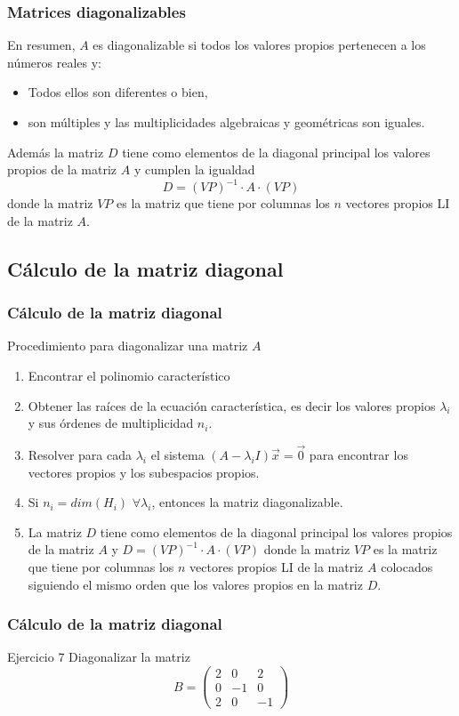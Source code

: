 \documentclass{beamer}
\begin{document}
\begin{frame}
\frametitle{Matrices diagonalizables}
En resumen, $A$ es diagonalizable si todos los valores propios pertenecen a los n\'umeros reales y:
\begin{itemize}
\item Todos ellos son diferentes o bien,
\item son m\'ultiples y las multiplicidades algebraicas y geom\'etricas son iguales.
\end{itemize}

Adem\'as la matriz $D$ tiene como elementos de la diagonal principal los valores propios de la matriz $A$ y cumplen la igualdad \[D = (VP)^{-1}\cdot A \cdot (VP)\] donde la matriz $VP$ es la matriz que tiene por columnas los $n$ vectores propios LI de la matriz $A$.
\end{frame}


\subsection{C\'alculo de la matriz diagonal}
\begin{frame}
\frametitle{C\'alculo de la matriz diagonal}
\begin{block}{Procedimiento para diagonalizar una matriz $A$}
\begin{enumerate}
\item Encontrar el polinomio caracter\'istico
\item Obtener las ra\'ices de la ecuaci\'on caracter\'istica, es decir los valores propios $\lambda_i$ y sus \'ordenes de multiplicidad $n_i$.
\item Resolver para cada $\lambda_i$ el sistema $(A-\lambda_i I) \vec x = \vec 0$ para encontrar los vectores propios y los subespacios propios.
\item Si $n_i = dim(H_i)$ $\forall \lambda_i$, entonces la matriz diagonalizable.
\item La matriz $D$ tiene como elementos de la diagonal principal los valores propios de la matriz $A$ y $D = (VP)^{-1}\cdot A \cdot (VP)$ donde la matriz $VP$ es la matriz que tiene por columnas los $n$ vectores propios LI de la matriz $A$ colocados siguiendo el mismo orden que los valores propios en la matriz $D$.
\end{enumerate}

\end{block}
\end{frame}


\begin{frame}
\frametitle{C\'alculo de la matriz diagonal}
\begin{block}{Ejercicio 7}
Diagonalizar la matriz \[B=\left(\begin{array}{ccc}2 & 0 & 2 \\0 & -1 & 0 \\2 & 0 & -1\end{array}\right)\]
\end{block}
\end{frame}
\end{document}
